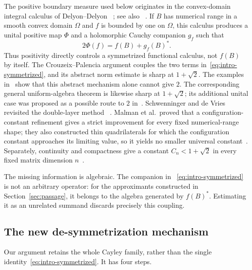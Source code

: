 \documentclass[preprints,article,submit,oneauthor]{Definitions/mdpi}
\theoremstyle{mdpi}
\theoremstyle{definition}
\begin{document}
The positive boundary measure used below originates in the
convex-domain integral calculus of Delyon--Delyon~%
\cite{DelyonDelyon1999}; see also~%
\cite{BadeaCrouzeixDelyon2006,CrouzeixPalencia2017}.  If $B$ has
numerical range in a smooth convex domain $\Omega$ and $f$ is bounded
by one on $\Omega$, this calculus produces a unital positive map
$\Phi$ and a holomorphic Cauchy companion $g_f$ such that
\begin{equation}
  2\Phi(f)=f(B)+g_f(B)^*.
  \label{eq:intro-symmetrized}
\end{equation}
Thus positivity directly controls a symmetrized functional calculus,
not $f(B)$ by itself.  The Crouzeix--Palencia argument couples the two
terms in~\eqref{eq:intro-symmetrized}, and its abstract norm estimate is
sharp at $1+\sqrt2$.  The examples in~%
\cite{RansfordSchwenninger2018} show that this abstract mechanism alone
cannot give $2$.  The corresponding general uniform-algebra theorem is
likewise sharp at $1+\sqrt2$; its additional unital case was proposed
as a possible route to $2$ in~\cite{ClouatreOstermannRansford2023}.
Schwenninger and de Vries revisited the double-layer method~%
\cite{SchwenningerDeVries2025}.  Malman et al.\ proved that a
configuration-constant refinement gives a strict improvement for every
fixed numerical-range shape; they also constructed thin quadrilaterals
for which the configuration constant approaches its limiting value, so
it yields no smaller universal constant~\cite{MalmanEtAl2025}.
Separately,
continuity and compactness give a constant $C_n<1+\sqrt2$ in every
fixed matrix dimension $n$~\cite{MalmanRatio2024}.

The missing information is algebraic.  The companion in~%
\eqref{eq:intro-symmetrized} is not an arbitrary operator: for the
approximants constructed in Section~\ref{sec:passage}, it belongs to
the algebra generated by $f(B)^*$.  Estimating it as an unrelated
summand discards precisely this coupling.

\subsection{The new de-symmetrization mechanism}

Our argument retains the whole Cayley family, rather than the single
identity~\eqref{eq:intro-symmetrized}.  It has four steps.
\end{document}
